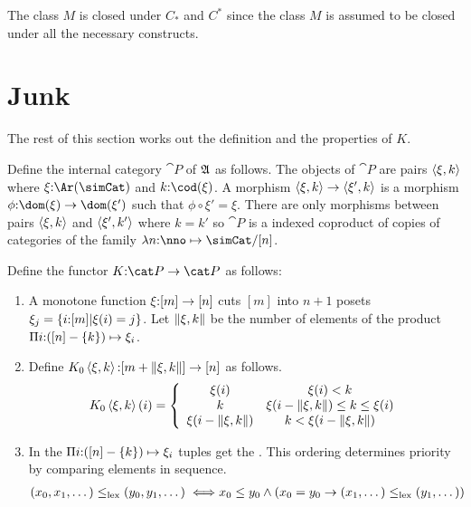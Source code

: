 \documentclass[csh.tex]{subfiles}
\begin{document}
\begin{remark} 
The class $M$ is closed under $C_*$ and $C^*$ since the class $M$ is assumed to be closed under all the necessary constructs. \end{remark}

\section{Junk}

The rest of this section works out the definition and the properties of $K$.

\begin{definition}
Define the internal category $\cat P$ of $\mathfrak A$ as follows. The objects of $\cat P$ are pairs $\left\langle \xi,k \right\rangle$ where $\xi\of\Ar(\simCat)$ and $k\of \cod(\xi)$. A morphism $\left\langle \xi,k \right\rangle\to \left\langle \xi',k \right\rangle$ is a morphism $\phi\of \dom(\xi)\to \dom(\xi')$ such that $\phi\circ \xi'= \xi$. There are only morphisms between pairs $\left\langle \xi,k \right\rangle$ and $\left\langle \xi',k' \right\rangle$ where $k=k'$ so $\cat P$ is a indexed coproduct of copies of categories of the family $\function{n\of\nno}\simCat/[n]$.

Define the functor $K\of \cat P\to\cat P$ as follows:
\begin{enumerate}
\item A monotone function $\xi\mathord :[m]\to[n]$ cuts $[m]$ into $n + 1$ posets $\xi_j = \left\{i\mathord :[m]|\xi(i)=j\right\}$. 
 Let $\Vert \xi,k \Vert$ be the number of elements of the product $\Pi i\mathord : ([n]-\left\{k\right\}) \mapsto{\xi_i}$. 
\item Define $K_0\left\langle \xi,k \right\rangle\mathord : [m+\Vert \xi,k \Vert]\to [n]$ as follows.
\[ 
	K_0\left\langle \xi,k \right\rangle(i) = \left\{
		\begin{array}{cc}
			\xi(i) & \xi(i)<k \\
			k & \xi(i-\Vert \xi,k \Vert)\leq k \leq \xi(i)\\
			\xi(i-\Vert \xi,k \Vert) & k<\xi(i-\Vert \xi,k \Vert)
		\end{array}
	\right.
\]

\item In the  $\Pi i\mathord :([n]-\left\{k\right\}) \mapsto{\xi_i}$ tuples get the . This ordering determines priority by comparing elements in sequence.
\begin{align*} 
(x_0,x_1,\dotsc) \leq_{\rm lex} (y_0,y_1,\dotsc) \iff& x_0\leq y_0 \land (x_0=y_0 \to (x_1,\dotsc)\leq_{\rm lex}(y_1,\dotsc))
\end{align*}


\end{enumerate}
\end{definition}
\end{document}

